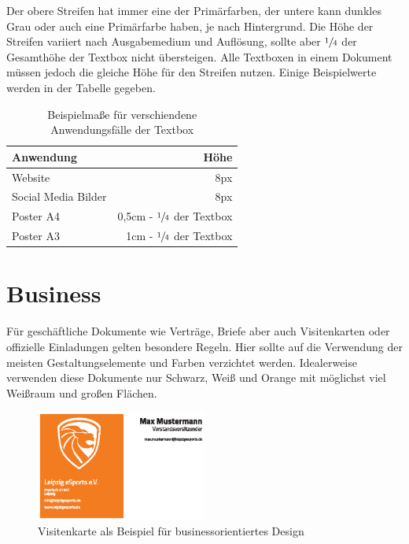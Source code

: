 \documentclass{article}
\begin{document}
Der obere Streifen hat immer eine der Primärfarben, der untere kann dunkles Grau oder auch eine Primärfarbe haben, je nach Hintergrund.
Die Höhe der Streifen variiert nach Ausgabemedium und Auflösung, sollte aber $\sfrac{1}{4}$ der Gesamthöhe der Textbox nicht übersteigen.
Alle Textboxen in einem Dokument müssen jedoch die gleiche Höhe für den Streifen nutzen.
Einige Beispielwerte werden in der Tabelle gegeben.

\begin{table}[H]
\begin{center}
\begin{tabular}{ | l | r | }
\hline
  \textbf{Anwendung} & \textbf{Höhe} \\
\hline
  Website & 8px \\
\hline
  Social Media Bilder & 8px \\
\hline
  Poster A4 & 0,5cm - $\sfrac{1}{4}$ der Textbox \\
\hline
  Poster A3 & 1cm - $\sfrac{1}{4}$ der Textbox \\
\hline
\end{tabular}
\end{center}
\caption{Beispielmaße für verschiendene Anwendungsfälle der Textbox}
\end{table}


\cleardoublepage
\section{Business}

Für geschäftliche Dokumente wie Verträge, Briefe aber auch Visitenkarten oder offizielle Einladungen gelten besondere Regeln.
Hier sollte auf die Verwendung der meisten Gestaltungselemente und Farben verzichtet werden.
Idealerweise verwenden diese Dokumente nur Schwarz, Weiß und Orange mit möglichst viel Weißraum und großen Flächen.

\begin{figure}[H]
\begin{center}
\includegraphics[width=0.5\textwidth]{Docs/Visitenkarte.eps}
\end{center}
\caption{Visitenkarte als Beispiel für businessorientiertes Design}
\end{figure}
\end{document}
